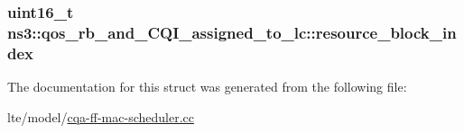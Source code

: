 \subsubsection[{\texorpdfstring{resource\+\_\+block\+\_\+index}{resource_block_index}}]{\setlength{\rightskip}{0pt plus 5cm}uint16\+\_\+t ns3\+::qos\+\_\+rb\+\_\+and\+\_\+\+C\+Q\+I\+\_\+assigned\+\_\+to\+\_\+lc\+::resource\+\_\+block\+\_\+index}\hypertarget{structns3_1_1qos__rb__and__CQI__assigned__to__lc_a88a045497fd8312b8be75a8a98d3337a}{}\label{structns3_1_1qos__rb__and__CQI__assigned__to__lc_a88a045497fd8312b8be75a8a98d3337a}


The documentation for this struct was generated from the following file\+:\begin{DoxyCompactItemize}
\item 
lte/model/\hyperlink{cqa-ff-mac-scheduler_8cc}{cqa-\/ff-\/mac-\/scheduler.\+cc}\end{DoxyCompactItemize}
